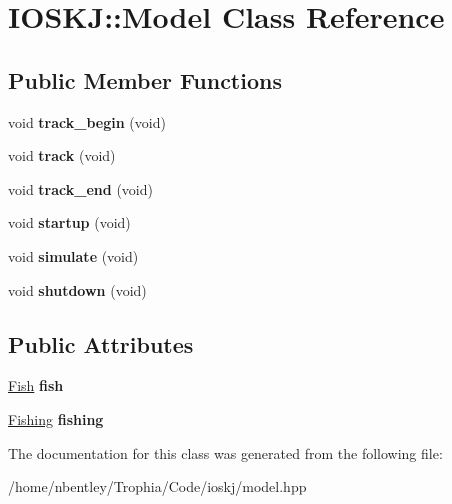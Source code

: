 \hypertarget{classIOSKJ_1_1Model}{\section{I\-O\-S\-K\-J\-:\-:Model Class Reference}
\label{classIOSKJ_1_1Model}
}
\subsection*{Public Member Functions}
\begin{DoxyCompactItemize}
\item 
\hypertarget{classIOSKJ_1_1Model_ae261a53c42f71d17182c1b129698126d}{void {\bfseries track\-\_\-begin} (void)}\label{classIOSKJ_1_1Model_ae261a53c42f71d17182c1b129698126d}

\item 
\hypertarget{classIOSKJ_1_1Model_af18a3687dd2685745174b91e0aae56ce}{void {\bfseries track} (void)}\label{classIOSKJ_1_1Model_af18a3687dd2685745174b91e0aae56ce}

\item 
\hypertarget{classIOSKJ_1_1Model_a03e6aeb637c83c34774ac66c18bac74d}{void {\bfseries track\-\_\-end} (void)}\label{classIOSKJ_1_1Model_a03e6aeb637c83c34774ac66c18bac74d}

\item 
\hypertarget{classIOSKJ_1_1Model_a6f42bfc7352faa7bba7e00d04fc166b0}{void {\bfseries startup} (void)}\label{classIOSKJ_1_1Model_a6f42bfc7352faa7bba7e00d04fc166b0}

\item 
\hypertarget{classIOSKJ_1_1Model_abf9ebdb10aee501808836438cb542fab}{void {\bfseries simulate} (void)}\label{classIOSKJ_1_1Model_abf9ebdb10aee501808836438cb542fab}

\item 
\hypertarget{classIOSKJ_1_1Model_a343216d7c9019f15f01f205423001005}{void {\bfseries shutdown} (void)}\label{classIOSKJ_1_1Model_a343216d7c9019f15f01f205423001005}

\end{DoxyCompactItemize}
\subsection*{Public Attributes}
\begin{DoxyCompactItemize}
\item 
\hypertarget{classIOSKJ_1_1Model_aa8bf5f43996857e428bb0745943363a4}{\hyperlink{classIOSKJ_1_1Fish}{Fish} {\bfseries fish}}\label{classIOSKJ_1_1Model_aa8bf5f43996857e428bb0745943363a4}

\item 
\hypertarget{classIOSKJ_1_1Model_a416c537ca8c64648516e928fcea72ef2}{\hyperlink{classIOSKJ_1_1Fishing}{Fishing} {\bfseries fishing}}\label{classIOSKJ_1_1Model_a416c537ca8c64648516e928fcea72ef2}

\end{DoxyCompactItemize}


The documentation for this class was generated from the following file\-:\begin{DoxyCompactItemize}
\item 
/home/nbentley/\-Trophia/\-Code/ioskj/model.\-hpp\end{DoxyCompactItemize}
